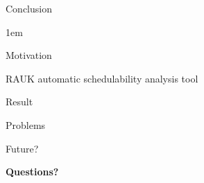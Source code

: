 \begin{frame}{Conclusion}

    \begin{itemize-size}{1em}
        \item Motivation
        \item RAUK automatic schedulability analysis tool
        \item Result
        \item Problems
        \item Future?
    \end{itemize-size}
    
\end{frame}

\begin{frame}
    \centering
    \huge \textbf{Questions?} 
\end{frame}
